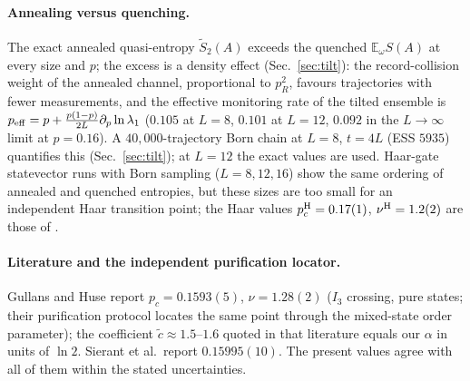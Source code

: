\documentclass[11pt]{article}
\newcommand{\E}{\mathbb{E}}
\begin{document}
\paragraph{Annealing versus quenching.}
The exact annealed quasi-entropy $\tilde S_2(A)$ exceeds the quenched
$\E_\omega S(A)$ at every size and $p$; the excess is a density effect
(Sec.~\ref{sec:tilt}): the record-collision weight of the annealed channel,
proportional to $p_R^2$, favours trajectories with fewer measurements, and
the effective monitoring rate of the tilted ensemble is
$p_{\rm eff}=p+\frac{p(1-p)}{2L}\partial_p\ln\lambda_1$
($0.105$ at $L=8$, $0.101$ at $L=12$, $0.092$ in the $L\to\infty$ limit at
$p=0.16$).  A $40{,}000$-trajectory Born chain at $L=8$, $t=4L$ (ESS
$5935$) quantifies this (Sec.~\ref{sec:tilt}); at $L=12$ the exact values
are used.  Haar-gate statevector runs with Born sampling ($L=8,12,16$) show
the same ordering of annealed and quenched entropies, but these sizes are
too small for an independent Haar transition point; the Haar values
$p_c^{\rm H}=0.17(1)$, $\nu^{\rm H}=1.2(2)$ are those of \citet{Zabalo2020}.

\paragraph{Literature and the independent purification locator.}
Gullans and Huse report $p_c=0.1593(5)$, $\nu=1.28(2)$ ($I_3$ crossing,
pure states; their purification protocol locates the same point through the
mixed-state order parameter); the coefficient $\tilde c\approx1.5$--$1.6$
quoted in that literature equals our $\alpha$ in units of $\ln 2$.
Sierant et al.\ report $0.15995(10)$.  The present values agree with all of
them within the stated uncertainties.
\end{document}
